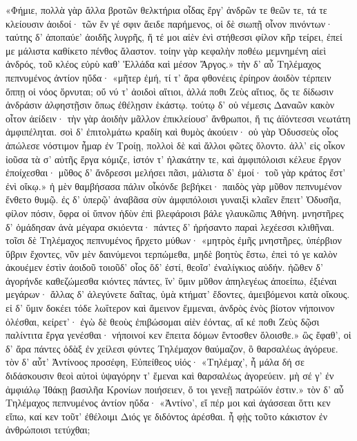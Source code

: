 \nstanza
«Φήμιε, πολλὰ γὰρ ἄλλα βροτῶν θελκτήρια οἶδας
ἔργ' ἀνδρῶν τε θεῶν τε, τά τε κλείουσιν ἀοιδοί·
τῶν ἕν γέ σφιν ἄειδε παρήμενος, οἱ δὲ σιωπῇ
οἶνον πινόντων· ταύτης δ' ἀποπαύε' ἀοιδῆς    
λυγρῆς, ἥ τέ μοι αἰὲν ἐνὶ στήθεσσι φίλον κῆρ
τείρει, ἐπεί με μάλιστα καθίκετο πένθος ἄλαστον.
τοίην γὰρ κεφαλὴν ποθέω μεμνημένη αἰεὶ
ἀνδρός, τοῦ κλέος εὐρὺ καθ' Ἑλλάδα καὶ μέσον Ἄργος.»
\nstanza
τὴν δ' αὖ Τηλέμαχος πεπνυμένος ἀντίον ηὔδα·
«μῆτερ ἐμή, τί τ' ἄρα φθονέεις ἐρίηρον ἀοιδὸν
τέρπειν ὅππῃ οἱ νόος ὄρνυται; οὔ νύ τ' ἀοιδοὶ
αἴτιοι, ἀλλά ποθι Ζεὺς αἴτιος, ὅς τε δίδωσιν
ἀνδράσιν ἀλφηστῇσιν ὅπως ἐθέλῃσιν ἑκάστῳ.
τούτῳ δ' οὐ νέμεσις Δαναῶν κακὸν οἶτον ἀείδειν·    
τὴν γὰρ ἀοιδὴν μᾶλλον ἐπικλείουσ' ἄνθρωποι,
ἥ τις ἀϊόντεσσι νεωτάτη ἀμφιπέληται.
σοὶ δ' ἐπιτολμάτω κραδίη καὶ θυμὸς ἀκούειν·
οὐ γὰρ Ὀδυσσεὺς οἶος ἀπώλεσε νόστιμον ἦμαρ
ἐν Τροίῃ, πολλοὶ δὲ καὶ ἄλλοι φῶτες ὄλοντο.
ἀλλ' εἰς οἶκον ἰοῦσα τὰ σ' αὐτῆς ἔργα κόμιζε,
ἱστόν τ' ἠλακάτην τε, καὶ ἀμφιπόλοισι κέλευε
ἔργον ἐποίχεσθαι· μῦθος δ' ἄνδρεσσι μελήσει
πᾶσι, μάλιστα δ' ἐμοί· τοῦ γὰρ κράτος ἔστ' ἐνὶ οἴκῳ.»
\nstanza
ἡ μὲν θαμβήσασα πάλιν οἶκόνδε βεβήκει·    
παιδὸς γὰρ μῦθον πεπνυμένον ἔνθετο θυμῷ.
ἐς δ' ὑπερῷ' ἀναβᾶσα σὺν ἀμφιπόλοισι γυναιξὶ
κλαῖεν ἔπειτ' Ὀδυσῆα, φίλον πόσιν, ὄφρα οἱ ὕπνον
ἡδὺν ἐπὶ βλεφάροισι βάλε γλαυκῶπις Ἀθήνη.
\nstanza
μνηστῆρες δ' ὁμάδησαν ἀνὰ μέγαρα σκιόεντα·
πάντες δ' ἠρήσαντο παραὶ λεχέεσσι κλιθῆναι.
τοῖσι δὲ Τηλέμαχος πεπνυμένος ἤρχετο μύθων·
\nstanza
«μητρὸς ἐμῆς μνηστῆρες, ὑπέρβιον ὕβριν ἔχοντες,
νῦν μὲν δαινύμενοι τερπώμεθα, μηδὲ βοητὺς
ἔστω, ἐπεὶ τό γε καλὸν ἀκουέμεν ἐστὶν ἀοιδοῦ    
τοιοῦδ' οἷος ὅδ' ἐστί, θεοῖσ' ἐναλίγκιος αὐδήν.
ἠῶθεν δ' ἀγορήνδε καθεζώμεσθα κιόντες
πάντες, ἵν' ὕμιν μῦθον ἀπηλεγέως ἀποείπω,
ἐξιέναι μεγάρων· ἄλλας δ' ἀλεγύνετε δαῖτας,
ὑμὰ κτήματ' ἔδοντες, ἀμειβόμενοι κατὰ οἴκους.
εἰ δ' ὕμιν δοκέει τόδε λωΐτερον καὶ ἄμεινον
ἔμμεναι, ἀνδρὸς ἑνὸς βίοτον νήποινον ὀλέσθαι,
κείρετ'· ἐγὼ δὲ θεοὺς ἐπιβώσομαι αἰὲν ἐόντας,
αἴ κέ ποθι Ζεὺς δῷσι παλίντιτα ἔργα γενέσθαι·
νήποινοί κεν ἔπειτα δόμων ἔντοσθεν ὄλοισθε.»    
\nstanza
ὣς ἔφαθ', οἱ δ' ἄρα πάντες ὀδὰξ ἐν χείλεσι φύντες
Τηλέμαχον θαύμαζον, ὃ θαρσαλέως ἀγόρευε.
\nstanza
τὸν δ' αὖτ' Ἀντίνοος προσέφη, Εὐπείθεος υἱός·
«Τηλέμαχ', ἦ μάλα δή σε διδάσκουσιν θεοὶ αὐτοὶ
ὑψαγόρην τ' ἔμεναι καὶ θαρσαλέως ἀγορεύειν.
μὴ σέ γ' ἐν ἀμφιάλῳ Ἰθάκῃ βασιλῆα Κρονίων
ποιήσειεν, ὅ τοι γενεῇ πατρώϊόν ἐστιν.»
\nstanza
τὸν δ' αὖ Τηλέμαχος πεπνυμένος ἀντίον ηὔδα·
«Ἀντίνο', εἴ πέρ μοι καὶ ἀγάσσεαι ὅττι κεν εἴπω,
καί κεν τοῦτ' ἐθέλοιμι Διός γε διδόντος ἀρέσθαι.    
ἦ φῂς τοῦτο κάκιστον ἐν ἀνθρώποισι τετύχθαι;
